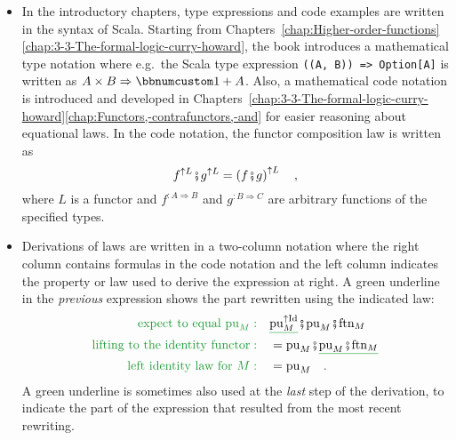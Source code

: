 \begin{itemize}
\item In the introductory chapters, type expressions and code examples are
written in the syntax of Scala. Starting from Chapters~\ref{chap:Higher-order-functions}\textendash \ref{chap:3-3-The-formal-logic-curry-howard},
the book introduces a mathematical type notation where e.g.~the Scala
type expression \lstinline!((A, B)) => Option[A]! is written as $A\times B\Rightarrow\bbnum 1+A$.
Also, a mathematical code notation is introduced and developed in
Chapters~\ref{chap:3-3-The-formal-logic-curry-howard}\textendash \ref{chap:Functors,-contrafunctors,-and}
for easier reasoning about equational laws. In the code notation,
the functor composition law is written as
\[
f^{\uparrow L}\bef g^{\uparrow L}=\left(f\bef g\right)^{\uparrow L}\quad,
\]
where $L$ is a functor and $f^{:A\Rightarrow B}$ and $g^{:B\Rightarrow C}$
are arbitrary functions of the specified types.
\item Derivations of laws are written in a two-column notation where the
right column contains formulas in the code notation and the left column
indicates the property or law used to derive the expression at right.
A green underline in the \emph{previous} expression shows the part
rewritten using the indicated law:
\begin{align*}
{\color{greenunder}\text{expect to equal }\text{pu}_{M}:}\quad & \gunderline{\text{pu}_{M}^{\uparrow\text{Id}}}\bef\text{pu}_{M}\bef\text{ftn}_{M}\\
{\color{greenunder}\text{lifting to the identity functor}:}\quad & =\text{pu}_{M}\bef\gunderline{\text{pu}_{M}\bef\text{ftn}_{M}}\\
{\color{greenunder}\text{left identity law for }M:}\quad & =\text{pu}_{M}\quad.
\end{align*}
A green underline is sometimes also used at the \emph{last} step of
the derivation, to indicate the part of the expression that resulted
from the most recent rewriting.
\end{itemize}

